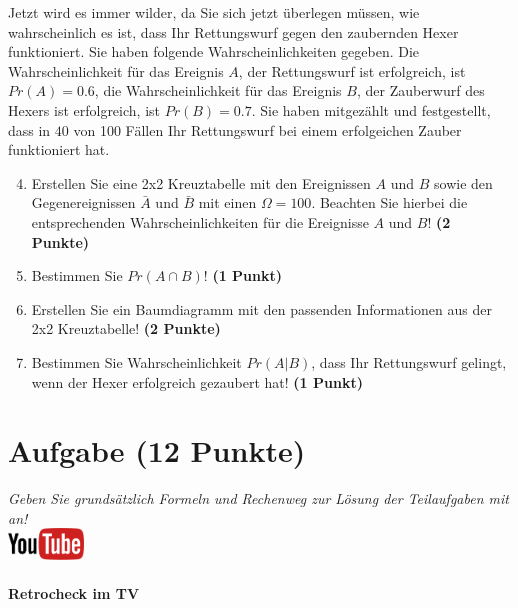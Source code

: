 \documentclass[a4paper, 9pt]{scrartcl}\usepackage[]{graphicx}\usepackage[]{xcolor}
\begin{document}
Jetzt wird es immer wilder, da Sie sich jetzt {\"u}berlegen m{\"u}ssen, wie
wahrscheinlich es ist, dass Ihr Rettungswurf gegen den zaubernden Hexer
funktioniert. Sie haben folgende Wahrscheinlichkeiten gegeben. Die
Wahrscheinlichkeit f{\"u}r das Ereignis $A$, der Rettungswurf ist erfolgreich,
ist $Pr(A) = 0.6$, die Wahrscheinlichkeit f{\"u}r das Ereignis $B$,
der Zauberwurf des Hexers ist erfolgreich, ist $Pr(B) = 0.7$. Sie
haben mitgez{\"a}hlt und festgestellt, dass in $40$ von 100 F{\"a}llen
Ihr Rettungswurf bei einem erfolgeichen Zauber funktioniert hat.  

\begin{enumerate}
  \setcounter{enumi}{3}
\item Erstellen Sie eine 2x2 Kreuztabelle mit den Ereignissen $A$ und $B$
  sowie den Gegenereignissen $\bar{A}$ und $\bar{B}$ mit einen
  $\Omega = 100$. Beachten Sie hierbei die entsprechenden
  Wahrscheinlichkeiten f{\"u}r die Ereignisse $A$ und $B$! \textbf{(2 Punkte)}
\item Bestimmen Sie $Pr(A \cap B)$! \textbf{(1 Punkt)}
\item Erstellen Sie ein Baumdiagramm mit den passenden Informationen aus der 2x2
  Kreuztabelle! \textbf{(2 Punkte)}
\item Bestimmen Sie Wahrscheinlichkeit $Pr(A|B)$, dass Ihr Rettungswurf gelingt, wenn
  der Hexer erfolgreich gezaubert hat! \textbf{(1 Punkt)}
\end{enumerate}

  
\clearpage

\section{Aufgabe \hfill (12 Punkte)}

\textit{Geben Sie grunds{\"a}tzlich Formeln und Rechenweg zur L{\"o}sung der
  Teilaufgaben mit an!} \\[1Ex]

\hfill\href{https://youtu.be/9DQKaXdxT_g}{\includegraphics[width =
  2cm]{img/youtube}} %
\hspace{2Ex}

\paragraph{Retrocheck im TV}
\end{document}
